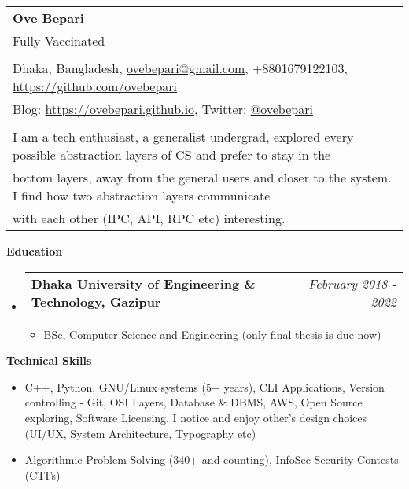 \documentclass[letterpaper,10pt]{article}
\makeatletter
\newcommand{\resheading}[1]{{\large \colorbox{mygrey}{\begin{minipage}{\textwidth}{\textbf{#1 \vphantom{p\^{E}}}}\end{minipage}}}}
\newcommand{\ressubheading}[4]{
	\begin{tabular*}{7.1in}{l@{\extracolsep{\fill}}r}
		\textbf{#1} & \textit{#4} \\
	\end{tabular*}\vspace{-6pt}}
\makeatother
\begin{document}
	
	\begin{tabular*}{7.5in}{l@{\extracolsep{\fill}}}
		\textbf{\large Ove Bepari}\\
		{\scriptsize Fully Vaccinated}
		\\
		\\
		
		Dhaka, Bangladesh, \href{mailto:ovebepari@gmail.com}{ovebepari@gmail.com}, +8801679122103, \url{https://github.com/ovebepari} \\
		 Blog: \url{https://ovebepari.github.io}, Twitter: \href{https://twitter.com/ovebepari}{@ovebepari}
		\\
		\\
		I am a tech enthusiast, a generalist undergrad, explored every possible abstraction layers of CS and prefer to stay in the\\bottom layers, away from the general users and closer to the system. I find how two abstraction layers communicate\\with each other (IPC, API, RPC etc) interesting.
	\end{tabular*}
	
	\vspace{0.2in}
	
	\resheading{Education}
	\begin{itemize}
	
		\item \ressubheading{Dhaka University of Engineering \& Technology, Gazipur}{}{}{February 2018 - 2022}
		\begin{itemize}
			\item BSc, Computer Science and Engineering (only final thesis is due now)
		\end{itemize}
	
	\end{itemize}
	
	\vspace{0.08in}
	
	\resheading{Technical Skills}
	\begin{itemize}
		\item C++, Python, GNU/Linux systems (5+ years), CLI Applications, Version controlling - Git, OSI Layers, Database \& DBMS, AWS, Open Source exploring, Software Licensing. I notice and enjoy other's design choices (UI/UX, System Architecture, Typography etc)
		\item Algorithmic Problem Solving (340+ and counting), InfoSec Security Contests (CTFs)
	\end{itemize}
\end{document}
